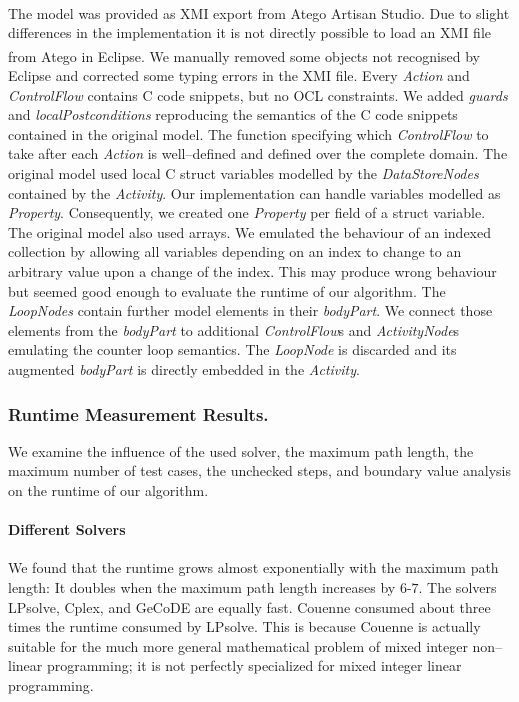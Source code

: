 \documentclass[runningheads,a4paper]{llncs}%
\newcommand{\UMLType}[1]{\textsf{\textit{#1}}} %
\newcommand{\UMLReference}[1]{\textsf{\textit{#1}}} %
\begin{document}
The model was provided as XMI export from Atego\textsuperscript{\textregistered}
Artisan Studio. Due to slight differences in the implementation it is not
directly possible to load an XMI file from
Atego\textsuperscript{\textregistered} in Eclipse. We manually removed some
objects not recognised by Eclipse and corrected some typing errors in the XMI
file. Every \UMLType{Action} and \UMLReference{ControlFlow} contains C code
snippets, but no OCL constraints. We added \UMLReference{guards} and
\UMLReference{localPostconditions} reproducing the semantics of the C code
snippets contained in the original model. The function specifying which
\UMLType{ControlFlow} to take after each \UMLType{Action} is well--defined and
defined over the complete domain. The original model used local C struct
variables modelled by the \UMLType{DataStoreNodes} contained by the
\UMLType{Activity}. Our implementation can handle variables modelled as
\UMLType{Property}. Consequently, we created one \UMLType{Property} per field of
a struct variable. The original model also used arrays. We emulated the
behaviour of an indexed collection by allowing all variables depending on an
index to change to an arbitrary value upon a change of the index. This may
produce wrong behaviour but seemed good enough to evaluate the runtime of our
algorithm. The \UMLType{LoopNodes} contain further model elements in their
\UMLReference{bodyPart}. We connect those elements from the
\UMLReference{bodyPart} to additional \UMLType{ControlFlow}s and
\UMLType{ActivityNode}s emulating the counter loop semantics. The
\UMLType{LoopNode} is discarded and its augmented \UMLReference{bodyPart} is
directly embedded in the \UMLType{Activity}.
%
\subsubsection{Runtime Measurement Results.}
We examine the influence of the used solver, the maximum path length, the
maximum number of test cases, the unchecked steps, and boundary value analysis
on the runtime of our algorithm.
%
\paragraph{Different Solvers}%
We found that the runtime grows almost exponentially with the maximum path
length: It doubles when the maximum path length increases by $6$-$7$. The
solvers LPsolve, Cplex, and GeCoDE are equally fast. Couenne consumed about
three times the runtime consumed by LPsolve. This is because Couenne is actually
suitable for the much more general mathematical problem of mixed integer
non--linear programming; it is not perfectly specialized for mixed integer
linear programming.
\end{document}
